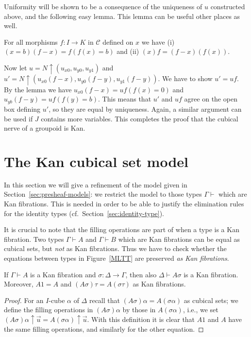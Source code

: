 \documentclass[10pt,a4paper]{article}
\newcommand{\CC}{{\mathcal C}}
\newcommand{\rup}[1]{#1{\uparrow}}
\begin{document}
Uniformity will be shown to be a consequence of the uniqueness of
$u$ constructed above, and the following easy lemma.
This lemma can be useful other places as well.
\begin{lemma}  For all morphisms $f:I\to K$ in $\CC$ defined on $x$ we have
(i) $(x=b)(f-x) = f (f(x)=b)$ and (ii) $(x)f = (f-x)(f(x))$.
\end{lemma}
Now let $u=\rup{N}(u_{x0},u_{y0},u_{y1})$ and
$u'=\rup{N}(u_{x0}(f-x),u_{y0}(f-y),u_{y1}(f-y))$.
We have to show $u'=uf$.
By the lemma we have $u_{x0}(f-x) = uf(f(x)=0)$ and $u_{yb}(f-y) = uf(f(y)=b)$.
This means that $u'$ and $uf$ agree on the open box defining $u'$,
so they are equal by uniqueness.
Again, a similar argument can be used if $J$ contains more variables.
This completes the proof that the cubical nerve of a groupoid is Kan.

\section{The Kan cubical set model}\label{sec:kancubsetmodel}


In this section we will give a refinement of the model given in
Section~\ref{sec:presheaf-models}: we restrict the model to those
types $\Gamma \vdash$ which are Kan fibrations.  This is needed in
order to be able to justify the elimination rules for the identity
types (cf.\ Section~\ref{sec:identity-type}).

It is crucial to note that the filling operations are part of when a
type is a Kan fibration.  Two types $\Gamma \vdash A$ and $\Gamma
\vdash B$ which are Kan fibrations can be equal as cubical sets, but
\emph{not} as Kan fibrations.  Thus we have to check whether the
equations between types in Figure~\ref{MLTT} are preserved \emph{as Kan
  fibrations}.

\begin{theorem}
  If $\Gamma \vdash A$ is a Kan fibration and $\sigma \colon \Delta
  \to \Gamma$, then also $\Delta \vdash A \sigma$ is a Kan fibration.
  Moreover, $A 1 = A$ and $(A \sigma) \tau = A (\sigma \tau)$ as Kan
  fibrations.
\end{theorem}
\begin{proof}
  For an $I$-cube $\alpha$ of $\Delta$ recall that $(A \sigma) \alpha
  = A (\sigma \alpha)$ as cubical sets; we define the filling
  operations in $(A \sigma) \alpha$ by those in $A (\sigma \alpha)$,
  i.e., we set $\rup{(A \sigma) \alpha} {\vec u} = \rup {A (\sigma
    \alpha)} {\vec u}$.  With this definition it is clear that $A 1$
  and $A$ have the same filling operations, and similarly for the
  other equation.
\end{proof}
\end{document}
